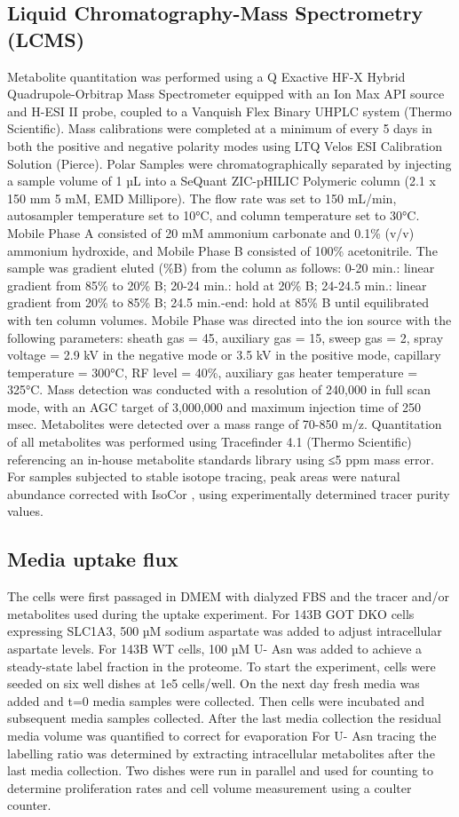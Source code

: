 \subsection{Liquid Chromatography-Mass Spectrometry (LCMS)}
Metabolite quantitation was performed using a Q Exactive HF-X Hybrid Quadrupole-Orbitrap Mass Spectrometer equipped with an Ion Max API source and H-ESI II probe, coupled to a Vanquish Flex Binary UHPLC system (Thermo Scientific).
Mass calibrations were completed at a minimum of every 5 days in both the positive and negative polarity modes using LTQ Velos ESI Calibration Solution (Pierce).
Polar Samples were chromatographically separated by injecting a sample volume of 1 µL into a SeQuant ZIC-pHILIC Polymeric column (2.1 x 150 mm 5 mM, EMD Millipore).
The flow rate was set to 150 mL/min, autosampler temperature set to 10°C, and column temperature set to 30°C.
Mobile Phase A consisted of 20 mM ammonium carbonate and 0.1\% (v/v) ammonium hydroxide, and Mobile Phase B consisted of 100\% acetonitrile.
The sample was gradient eluted (\%B) from the column as follows: 0-20 min.: linear gradient from 85\% to 20\% B; 20-24 min.: hold at 20\% B; 24-24.5 min.: linear gradient from 20\% to 85\% B; 24.5 min.-end: hold at 85\% B until equilibrated with ten column volumes.
Mobile Phase was directed into the ion source with the following parameters: sheath gas = 45, auxiliary gas = 15, sweep gas = 2, spray voltage = 2.9 kV in the negative mode or 3.5 kV in the positive mode, capillary temperature = 300°C, RF level = 40\%, auxiliary gas heater temperature = 325°C.
Mass detection was conducted with a resolution of 240,000 in full scan mode, with an AGC target of 3,000,000 and maximum injection time of 250 msec.
Metabolites were detected over a mass range of 70-850 m/z.
Quantitation of all metabolites was performed using Tracefinder 4.1 (Thermo Scientific) referencing an in-house metabolite standards library using ≤5 ppm mass error.
For samples subjected to stable isotope tracing, peak areas were natural abundance corrected with IsoCor \cite{Millard2019-hv}, using experimentally determined tracer purity values.


\subsection{Media uptake flux}
The cells were first passaged in DMEM with dialyzed FBS and the tracer and/or metabolites used during the uptake experiment.
For 143B GOT DKO cells expressing SLC1A3, 500 µM sodium aspartate was added to adjust intracellular aspartate levels.
For 143B WT cells, 100 µM U-\hCi{} Asn was added to achieve a steady-state label fraction in the proteome.
To start the experiment, cells were seeded on six well dishes at 1e5 cells/well.
On the next day fresh media was added and t=0 media samples were collected.
Then cells were incubated and subsequent media samples collected.
After the last media collection the residual media volume was quantified to correct for evaporation
For U-\hCi{} Asn tracing the labelling ratio was determined by extracting intracellular metabolites after the last media collection.
Two dishes were run in parallel and used for counting to determine proliferation rates and cell volume measurement using a coulter counter.



